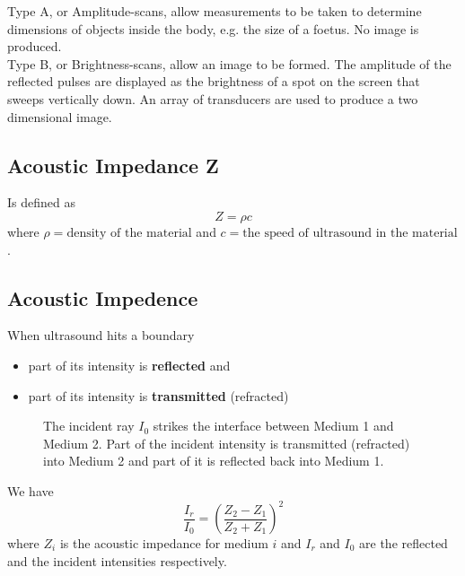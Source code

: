 \documentclass{article}
\begin{document}
Type A, or Amplitude-scans, allow measurements to be taken to determine dimensions of objects inside the body, e.g. the size of a foetus. No image is produced.\\

Type B, or Brightness-scans, allow an image to be formed. The amplitude of the reflected pulses are displayed as the brightness of a spot on the screen that sweeps vertically down. An array of transducers are used to produce a two dimensional image.


\subsection*{Acoustic Impedance Z}

Is defined as
\begin{displaymath}
Z = \rho c
\end{displaymath}
where $\rho=\text{density of the material}$ and $c=\text{the speed of ultrasound in the material}$.

\subsection*{Acoustic Impedence}
When ultrasound hits a boundary
\begin{itemize}
\item{part of its intensity is \textbf{reflected} and}
\item{part of its intensity is \textbf{transmitted} (refracted)}
\end{itemize}
\begin{figure}[h]
\centering
{}
\label{Figure:IncidentTransmittedReflected}
\caption{The incident ray $I_0$ strikes the interface between Medium 1 and Medium 2. Part of the incident intensity is transmitted (refracted) into Medium 2 and part of it is reflected back into Medium 1.}
\end{figure}
\noindent
We have
\begin{displaymath}
\frac{I_r}{I_0}=\left(\frac{Z_2-Z_1}{Z_2+Z_1}\right)^2
\end{displaymath}
where $Z_i$ is the acoustic impedance for medium $i$ and $I_r$ and $I_0$ are the reflected and the incident intensities respectively.
\end{document}
